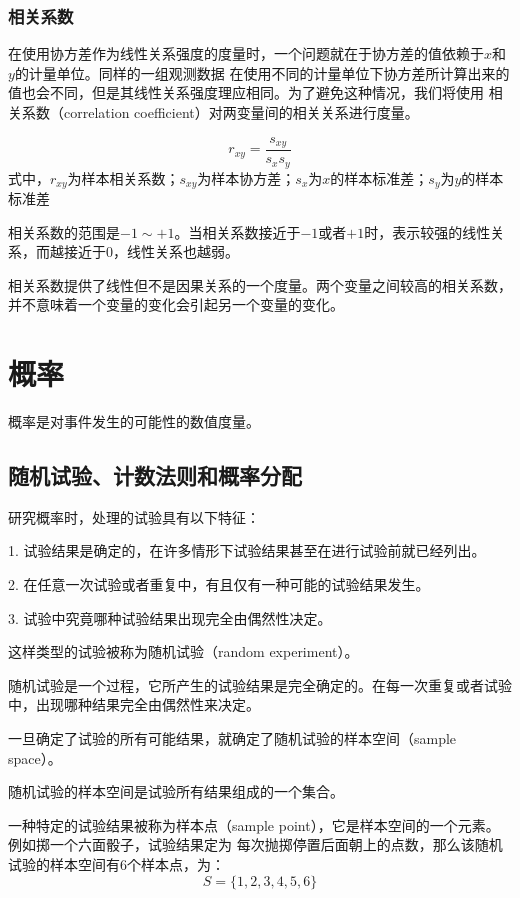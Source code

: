 \documentclass[a4paper]{ctexrep}
\begin{document}
\subsection{相关系数}
在使用协方差作为线性关系强度的度量时，一个问题就在于协方差的值依赖于$x$和$y$的计量单位。同样的一组观测数据
在使用不同的计量单位下协方差所计算出来的值也会不同，但是其线性关系强度理应相同。为了避免这种情况，我们将使用
相关系数（correlation coefficient）对两变量间的相关关系进行度量。
\begin{tcolorbox}[title = {皮尔逊积矩相关系数：样本数据}]
\[r_{xy}=\frac{s_{xy}}{s_{x}s_{y}}\]
式中，$r_{xy}$为样本相关系数；$s_{xy}$为样本协方差；$s_{x}$为$x$的样本标准差；$s_{y}$为$y$的样本标准差
\end{tcolorbox}
相关系数的范围是$-1\sim+1$。当相关系数接近于$-1$或者$+1$时，表示较强的线性关系，而越接近于0，线性关系也越弱。

相关系数提供了线性但不是因果关系的一个度量。两个变量之间较高的相关系数，并不意味着一个变量的变化会引起另一个变量的变化。


\chapter{概率}
概率是对事件发生的可能性的数值度量。

\section{随机试验、计数法则和概率分配}
研究概率时，处理的试验具有以下特征：

1. 试验结果是确定的，在许多情形下试验结果甚至在进行试验前就已经列出。

2. 在任意一次试验或者重复中，有且仅有一种可能的试验结果发生。

3. 试验中究竟哪种试验结果出现完全由偶然性决定。

这样类型的试验被称为随机试验（random experiment）。
\begin{tcolorbox}[title = {随机试验}]
随机试验是一个过程，它所产生的试验结果是完全确定的。在每一次重复或者试验中，出现哪种结果完全由偶然性来决定。
\end{tcolorbox}

一旦确定了试验的所有可能结果，就确定了随机试验的样本空间（sample space）。
\begin{tcolorbox}[title = {样本空间}]
随机试验的样本空间是试验所有结果组成的一个集合。
\end{tcolorbox}
一种特定的试验结果被称为样本点（sample point），它是样本空间的一个元素。例如掷一个六面骰子，试验结果定为
每次抛掷停置后面朝上的点数，那么该随机试验的样本空间有6个样本点，为：
\[S=\{1,2,3,4,5,6\}\]
\end{document}
